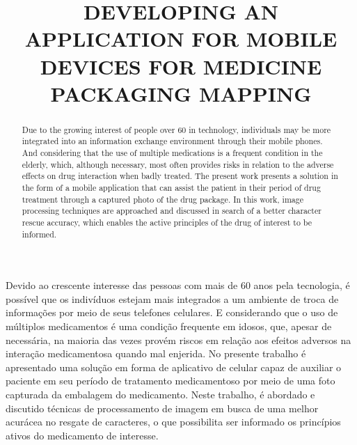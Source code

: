 \documentclass[oneside]{normas-utf-tex} %
\title{\MakeUppercase{DEVELOPING AN APPLICATION FOR MOBILE DEVICES FOR MEDICINE PACKAGING MAPPING}} %
\begin{document}
\capa %
\folhaderosto %

\termodeaprovacao

\begin{resumo}
Devido ao crescente interesse das pessoas com mais de 60 anos pela tecnologia, é possível que os indivíduos estejam mais integrados a um ambiente de troca de informações por meio de seus telefones celulares. E considerando que o uso de múltiplos medicamentos é uma condição frequente em idosos, que, apesar de necessária, na maioria das vezes provém riscos em relação aos efeitos adversos na interação medicamentosa quando mal enjerida. No presente trabalho é apresentado uma solução em forma de aplicativo de celular capaz de auxiliar o paciente em seu período de tratamento medicamentoso por meio de uma foto capturada da embalagem do medicamento. Neste trabalho, é abordado e discutido técnicas de processamento de imagem em busca de uma melhor acurácea no resgate de caracteres, o que possibilita ser informado os princípios ativos do medicamento de interesse.
\end{resumo}

\begin{abstract}
Due to the growing interest of people over 60 in technology, individuals may be more integrated into an information exchange environment through their mobile phones. And considering that the use of multiple medications is a frequent condition in the elderly, which, although necessary, most often provides risks in relation to the adverse effects on drug interaction when badly treated. The present work presents a solution in the form of a mobile application that can assist the patient in their period of drug treatment through a captured photo of the drug package. In this work, image processing techniques are approached and discussed in search of a better character rescue accuracy, which enables the active principles of the drug of interest to be informed.
\end{abstract}



\end{document}
